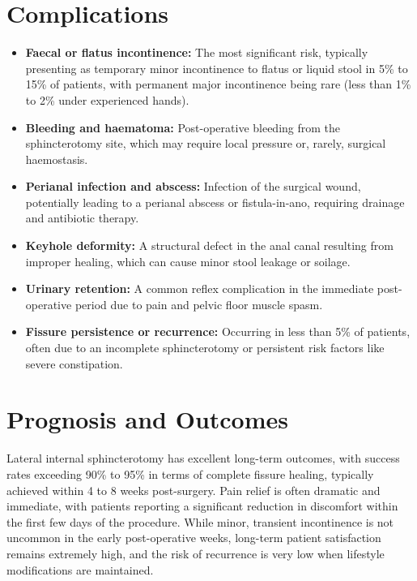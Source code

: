 \section*{Complications}
\begin{itemize}
    \item \textbf{Faecal or flatus incontinence:} The most significant risk, typically presenting as temporary minor incontinence to flatus or liquid stool in 5\% to 15\% of patients, with permanent major incontinence being rare (less than 1\% to 2\% under experienced hands).
    \item \textbf{Bleeding and haematoma:} Post-operative bleeding from the sphincterotomy site, which may require local pressure or, rarely, surgical haemostasis.
    \item \textbf{Perianal infection and abscess:} Infection of the surgical wound, potentially leading to a perianal abscess or fistula-in-ano, requiring drainage and antibiotic therapy.
    \item \textbf{Keyhole deformity:} A structural defect in the anal canal resulting from improper healing, which can cause minor stool leakage or soilage.
    \item \textbf{Urinary retention:} A common reflex complication in the immediate post-operative period due to pain and pelvic floor muscle spasm.
    \item \textbf{Fissure persistence or recurrence:} Occurring in less than 5\% of patients, often due to an incomplete sphincterotomy or persistent risk factors like severe constipation.
\end{itemize}

\section*{Prognosis and Outcomes}
Lateral internal sphincterotomy has excellent long-term outcomes, with success rates exceeding 90\% to 95\% in terms of complete fissure healing, typically achieved within 4 to 8 weeks post-surgery. Pain relief is often dramatic and immediate, with patients reporting a significant reduction in discomfort within the first few days of the procedure. While minor, transient incontinence is not uncommon in the early post-operative weeks, long-term patient satisfaction remains extremely high, and the risk of recurrence is very low when lifestyle modifications are maintained.

